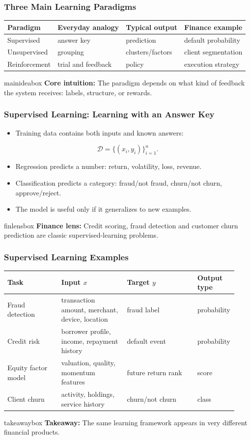\documentclass[aspectratio=169,12pt]{beamer}
\newcommand{\currentframetitle}{}
\newcommand{\slideTitle}[1]{\gdef\currentframetitle{#1}\frametitle{#1}}
\newcommand{\mainidea}[1]{%
  \vspace{0.08cm}
  \begin{beamercolorbox}[wd=\linewidth,rounded=true,sep=0.18cm]{mainideabox}
    \small\textbf{Core intuition:} #1
  \end{beamercolorbox}%
}
\newcommand{\finlens}[1]{%
  \vspace{0.08cm}
  \begin{beamercolorbox}[wd=\linewidth,rounded=true,sep=0.18cm]{finlensbox}
    \small\textbf{Finance lens:} #1
  \end{beamercolorbox}%
}
\newcommand{\takeaway}[1]{%
  \vspace{0.08cm}
  \begin{beamercolorbox}[wd=\linewidth,rounded=true,sep=0.18cm]{takeawaybox}
    \small\textbf{Takeaway:} #1
  \end{beamercolorbox}%
}
\begin{document}
\begin{frame}
\slideTitle{Three Main Learning Paradigms}
\begin{center}
\begin{tabular}{llll}
\toprule
Paradigm & Everyday analogy & Typical output & Finance example \\
\midrule
Supervised & answer key & prediction & default probability \\
Unsupervised & grouping & clusters/factors & client segmentation \\
Reinforcement & trial and feedback & policy & execution strategy \\
\bottomrule
\end{tabular}
\end{center}
\mainidea{The paradigm depends on what kind of feedback the system receives: labels, structure, or rewards.}
\end{frame}

\begin{frame}
\slideTitle{Supervised Learning: Learning with an Answer Key}
\begin{itemize}
  \item Training data contains both inputs and known answers:
\end{itemize}
\[
\mathcal{D}=\{(x_i,y_i)\}_{i=1}^n.
\]
\begin{itemize}
  \item Regression predicts a number: return, volatility, loss, revenue.
  \item Classification predicts a category: fraud/not fraud, churn/not churn, approve/reject.
  \item The model is useful only if it generalizes to new examples.
\end{itemize}
\finlens{Credit scoring, fraud detection and customer churn prediction are classic supervised-learning problems.}
\end{frame}

\begin{frame}
\slideTitle{Supervised Learning Examples}
\scriptsize
\begin{center}
\begin{tabular}{p{0.23\linewidth}p{0.29\linewidth}p{0.30\linewidth}p{0.11\linewidth}}
\toprule
Task & Input $x$ & Target $y$ & Output type \\
\midrule
Fraud detection & transaction amount, merchant, device, location & fraud label & probability \\
Credit risk & borrower profile, income, repayment history & default event & probability \\
Equity factor model & valuation, quality, momentum features & future return rank & score \\
Client churn & activity, holdings, service history & churn/not churn & class \\
\bottomrule
\end{tabular}
\end{center}
\takeaway{The same learning framework appears in very different financial products.}
\end{frame}
\end{document}
